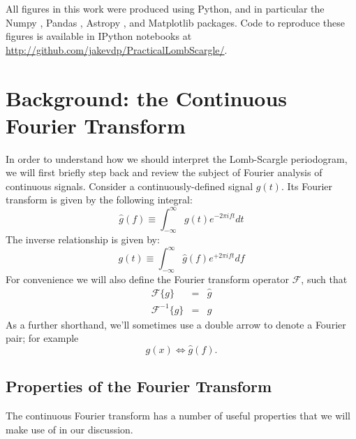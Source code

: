 \documentclass[preprint]{aastex}
\newcommand{\eqlabel}[1]{\label{eq:#1}}
\newcommand{\sectlabel}[1]{\label{sect:#1}}
\begin{document}
All figures in this work were produced using Python, and in particular the
Numpy \citep{numpy},
Pandas \citep{pandas},
Astropy \citep{Astropy2013},
and Matplotlib \citep{matplotlib} packages.
Code to reproduce these figures is available in IPython notebooks at \url{http://github.com/jakevdp/PracticalLombScargle/}.

\section{Background: the Continuous Fourier Transform}
\sectlabel{continuous-fourier-transform}

In order to understand how we should interpret the Lomb-Scargle periodogram, we will first briefly step back and review the subject of Fourier analysis of continuous signals.
Consider a continuously-defined signal $g(t)$.
Its Fourier transform is given by the following integral:
\begin{equation}
    \hat{g}(f) \equiv \int_{-\infty}^\infty g(t) e^{-2\pi i f t} dt
    \eqlabel{FT-def}
\end{equation}
The inverse relationship is given by:
\begin{equation}
    g(t) \equiv \int_{-\infty}^\infty \hat{g}(f) e^{+2\pi i f t} df
    \eqlabel{IFT-def}
\end{equation}
For convenience we will also define the Fourier transform operator
$\mathcal{F}$, such that
\begin{eqnarray}
    \mathcal{F}\{g\} &=& \hat{g} \\
    \mathcal{F}^{-1}\{\hat{g}\} &=& g
\end{eqnarray}
As a further shorthand, we'll sometimes use a double arrow to denote a Fourier
pair; for example
\begin{equation}
  g(x) \Longleftrightarrow \hat{g}(f).
\end{equation}

\subsection{Properties of the Fourier Transform}

The continuous Fourier transform has a number of useful properties that we will make use of in our discussion.
\end{document}
